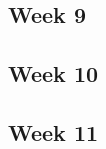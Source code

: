 \documentclass{article}
\begin{document}
\subsection{Week 9}



\subsection{Week 10}


\subsection{Week 11}
\end{document}
